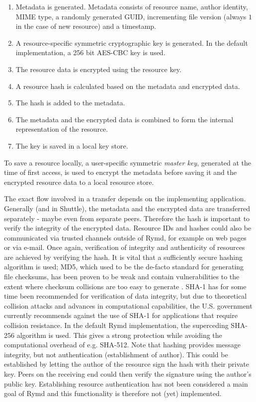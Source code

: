 \begin{enumerate}
  \item Metadata is generated. Metadata consists of resource name, author identity, MIME type, a randomly generated GUID, incrementing file version (always $1$ in the case of new resource) and a timestamp.
  \item A resource-specific symmetric cryptographic key is generated. In the default implementation, a 256 bit AES-CBC key is used.
  \item The resource data is encrypted using the resource key.
  \item A resource hash is calculated based on the metadata and encrypted data.
  \item The hash is added to the metadata.
  \item The metadata and the encrypted data is combined to form the internal representation of the resource.
  \item The key is saved in a local key store.
\end{enumerate}

To save a resource locally, a user-specific symmetric \emph{master key}, generated at the time of first access, is used to encrypt the metadata before saving it and the encrypted resource data to a local resource store.

The exact flow involved in a transfer depends on the implementing application. Generally (and in Shuttle), the metadata and the encrypted data are transferred separately - maybe even from separate peers. Therefore the hash is important to verify the integrity of the encrypted data. Resource IDs and hashes could also be communicated via trusted channels outside of Rymd, for example on web pages or via e-mail. Once again, verification of integrity and authenticity of resources are achieved by verifying the hash. It is vital that a sufficiently secure hashing algorithm is used; MD5, which used to be the de-facto standard for generating file checksums, has been proven to be weak and contain vulnerabilities to the extent where checksum collisions are too easy to generate \cite{MD5Broken:Online}. SHA-1 has for some time been recommended for verification of data integrity, but due to theoretical collision attacks and advances in computational capabilities, the U.S. government currently recommends against the use of SHA-1 for applications that require collision resistance\cite{NIST:2012}. In the default Rymd implementation, the superceding SHA-256 algorithm is used. This gives a strong protection while avoiding the computational overhead of e.g. SHA-512. Note that hashing provides message integrity, but not authentication (establishment of author). This could be established by letting the author of the resource sign the hash with their private key. Peers on the receiving end could then verify the signature using the author's public key. Establishing resource authentication has not been considered a main goal of Rymd and this functionality is therefore not (yet) implemented.

